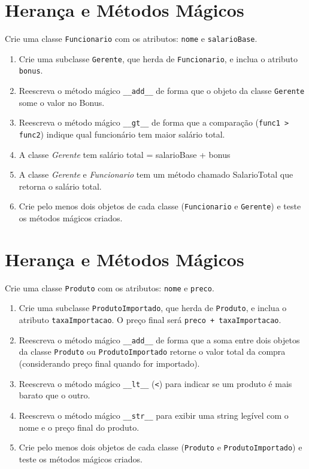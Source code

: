 \documentclass{article}
\begin{document}
\section{Herança e Métodos Mágicos}

Crie uma classe \texttt{Funcionario} com os atributos: \texttt{nome} e \texttt{salarioBase}.

\begin{enumerate}
    \item Crie uma subclasse \texttt{Gerente}, que herda de \texttt{Funcionario}, e inclua o atributo  \texttt{bonus}.
    \item Reescreva o método mágico \texttt{\_\_add\_\_} de forma que o objeto da classe \texttt{Gerente} some o valor no Bonus.
    \item Reescreva o método mágico \texttt{\_\_gt\_\_} de forma que a comparação (\texttt{func1 > func2})
          indique qual funcionário tem maior salário total.
    \item A classe \textit{Gerente} tem salário total = salarioBase + bonus
    \item A classe \textit{Gerente} e \textit{Funcionario} tem um método chamado SalarioTotal que retorna o salário total.
    \item Crie pelo menos dois objetos de cada classe (\texttt{Funcionario} e \texttt{Gerente}) e teste
          os métodos mágicos criados.
\end{enumerate}


\section{Herança e Métodos Mágicos}

Crie uma classe \texttt{Produto} com os atributos: \texttt{nome} e \texttt{preco}.

\begin{enumerate}
    \item Crie uma subclasse \texttt{ProdutoImportado}, que herda de \texttt{Produto}, e inclua o atributo \texttt{taxaImportacao}. O preço final será \texttt{preco + taxaImportacao}.
    \item Reescreva o método mágico \texttt{\_\_add\_\_} de forma que a soma entre dois objetos da classe \texttt{Produto} ou \texttt{ProdutoImportado} retorne o valor total da compra (considerando preço final quando for importado).
    \item Reescreva o método mágico \texttt{\_\_lt\_\_} (\texttt{<}) para indicar se um produto é mais barato que o outro.
    \item Reescreva o método mágico \texttt{\_\_str\_\_} para exibir uma string legível com o nome e o preço final do produto.
    \item Crie pelo menos dois objetos de cada classe (\texttt{Produto} e \texttt{ProdutoImportado}) e teste os métodos mágicos criados.
\end{enumerate}
\end{document}
